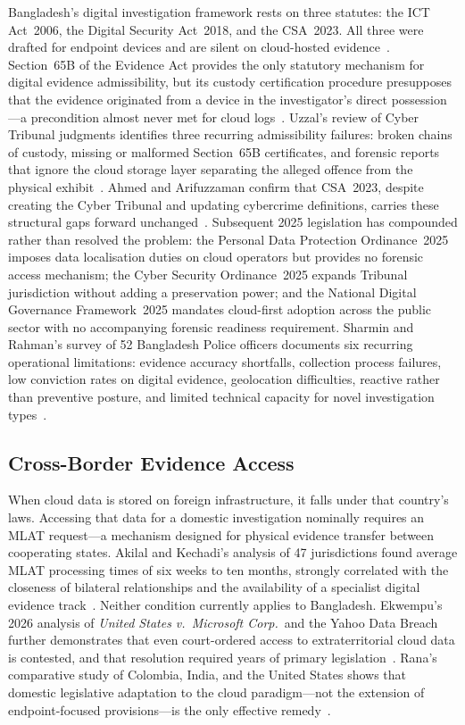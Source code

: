 \documentclass[sigconf,nonacm]{acmart}
\begin{document}
Bangladesh's digital investigation framework rests on three statutes:
the ICT Act~2006, the Digital Security Act~2018, and the CSA~2023. All
three were drafted for endpoint devices and are silent on cloud-hosted
evidence~\cite{ali2023}. Section~65B of the Evidence Act provides the
only statutory mechanism for digital evidence admissibility, but its
custody certification procedure presupposes that the evidence originated
from a device in the investigator's direct possession---a precondition
almost never met for cloud logs~\cite{sharmin2025}. Uzzal's review of
Cyber Tribunal judgments identifies three recurring admissibility
failures: broken chains of custody, missing or malformed Section~65B
certificates, and forensic reports that ignore the cloud storage layer
separating the alleged offence from the physical
exhibit~\cite{uzzal2025}. Ahmed and Arifuzzaman confirm that CSA~2023,
despite creating the Cyber Tribunal and updating cybercrime definitions,
carries these structural gaps forward unchanged~\cite{ahmed2025}.
Subsequent 2025 legislation has compounded rather than resolved the
problem: the Personal Data Protection Ordinance~2025 imposes data
localisation duties on cloud operators but provides no forensic access
mechanism; the Cyber Security Ordinance~2025 expands Tribunal
jurisdiction without adding a preservation power; and the National
Digital Governance Framework~2025 mandates cloud-first adoption across
the public sector with no accompanying forensic readiness requirement.
Sharmin and Rahman's survey of 52 Bangladesh Police officers documents
six recurring operational limitations: evidence accuracy shortfalls,
collection process failures, low conviction rates on digital evidence,
geolocation difficulties, reactive rather than preventive posture, and
limited technical capacity for novel investigation types~\cite{sharmin2025}.

\subsection{Cross-Border Evidence Access}

When cloud data is stored on foreign infrastructure, it falls under that
country's laws. Accessing that data for a domestic investigation
nominally requires an MLAT request---a mechanism designed for physical
evidence transfer between cooperating states. Akilal and Kechadi's
analysis of 47 jurisdictions found average MLAT processing times of six
weeks to ten months, strongly correlated with the closeness of bilateral
relationships and the availability of a specialist digital evidence
track~\cite{akilal2025}. Neither condition currently applies to
Bangladesh. Ekwempu's 2026 analysis of \textit{United States
v.\ Microsoft Corp.}\ and the Yahoo Data Breach further demonstrates
that even court-ordered access to extraterritorial cloud data is
contested, and that resolution required years of primary
legislation~\cite{ekwempu2026}. Rana's comparative study of Colombia,
India, and the United States shows that domestic legislative adaptation
to the cloud paradigm---not the extension of endpoint-focused
provisions---is the only effective remedy~\cite{rana2025}.
\end{document}

